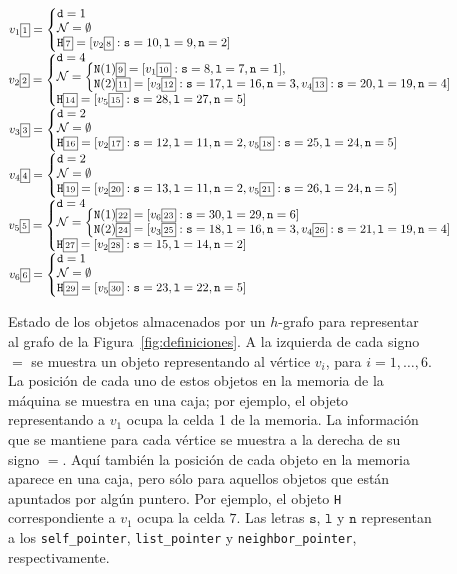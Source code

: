 \documentclass[%
    a4paper,%
    fontsize=12pt,%
    DIV=12,
    twoside,%
    openright,%
    titlepage=true,%
    headsepline,%
    toc=bibliography,%
    parskip=half,%
    cleardoublepage=empty,%
    headings=big,%
]{scrbook}
\makeatletter
\newcommand{\Code}[2][]{\lstinline[basicstyle={\ttfamily},#1]@#2@}
\makeatother
\begin{document}
\begin{figure}[ht]
\parindent=0pt\small

$\VV{1}{1}{\mathtt{d}=1\\
           \NNNEmpty\\
           \NH{7}{\neigh{v_2}{8}{10}{9}{2}}}$\\[2mm]
$\VV{2}{2}{\mathtt{d}=4\\
           \NNN{\NN{1}{9}{\neigh{v_1}{10}{8}{7}{1}},\\
                \NN{2}{11}{\neigh{v_3}{12}{17}{16}{3}, \neigh{v_4}{13}{20}{19}{4}}}\\
           \NH{14}{\neigh{v_5}{15}{28}{27}{5}}}$\\[2mm]
$\VV{3}{3}{\mathtt{d}=2\\
           \NNNEmpty \\
           \NH{16}{\neigh{v_2}{17}{12}{11}{2}, \neigh{v_5}{18}{25}{24}{5}}}$\\[2mm]
$\VV{4}{4}{\mathtt{d}=2\\
           \NNNEmpty \\
           \NH{19}{\neigh{v_2}{20}{13}{11}{2}, \neigh{v_5}{21}{26}{24}{5}}}$\\[2mm]
$\VV{5}{5}{\mathtt{d}=4\\
           \NNN{\NN{1}{22}{\neigh{v_6}{23}{30}{29}{6}} \\
                \NN{2}{24}{\neigh{v_3}{25}{18}{16}{3}, \neigh{v_4}{26}{21}{19}{4}}}\\
                \NH{27}{\neigh{v_2}{28}{15}{14}{2}}}$\\[2mm]
$\VV{6}{6}{\mathtt{d}=1\\
           \NNNEmpty \\
           \NH{29}{\neigh{v_5}{30}{23}{22}{5}}}$%
%

\caption{Estado de los objetos almacenados por un $h$-grafo para representar al grafo de la Figura~\ref{fig:definiciones}.  A la izquierda de cada signo $=$ se muestra un objeto representando al vértice $v_i$, para $i = 1, \ldots, 6$. La posición de cada uno de estos objetos en la memoria de la máquina se muestra en una caja; por ejemplo, el objeto representando a $v_1$ ocupa la celda 1 de la memoria.  La información que se mantiene para cada vértice se muestra a la derecha de su signo $=$.  Aquí también la posición de cada objeto en la memoria aparece en una caja, pero sólo para aquellos objetos que están apuntados por algún puntero.  Por ejemplo, el objeto \Code{H} correspondiente a $v_1$ ocupa la celda $7$.  Las letras $\mathtt{s}$, $\mathtt{l}$ y $\mathtt{n}$ representan a los \Code{self_pointer}, \Code{list_pointer} y \Code{neighbor_pointer}, respectivamente.} \label{fig:h-grafo}
\end{figure}
\end{document}
